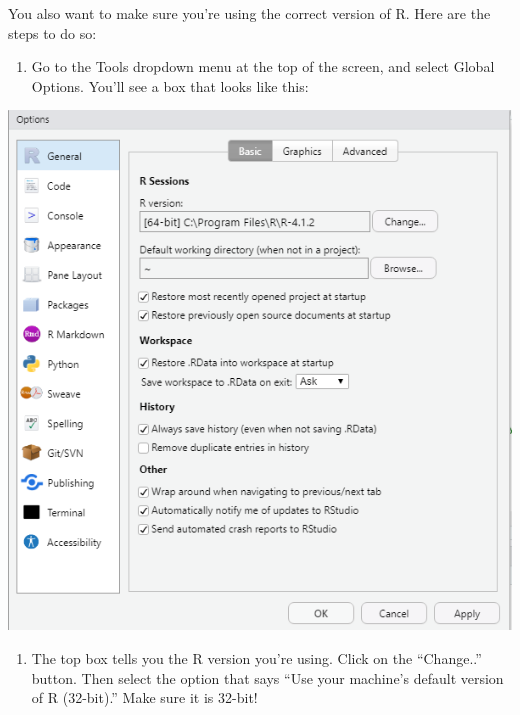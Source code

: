 \documentclass[]{book}
\providecommand{\tightlist}{%
  \setlength{\itemsep}{0pt}\setlength{\parskip}{0pt}}
\begin{document}
You also want to make sure you're using the correct version of R. Here are the steps to do so:

\begin{enumerate}
\def\labelenumi{\arabic{enumi})}
\tightlist
\item
  Go to the Tools dropdown menu at the top of the screen, and select Global Options. You'll see a box that looks like this:
\end{enumerate}

\includegraphics[width=8.18in]{images/options}

\begin{enumerate}
\def\labelenumi{\arabic{enumi})}
\setcounter{enumi}{1}
\tightlist
\item
  The top box tells you the R version you're using. Click on the ``Change..'' button. Then select the option that says ``Use your machine's default version of R (32-bit).'' Make sure it is 32-bit!
\end{enumerate}
\end{document}
